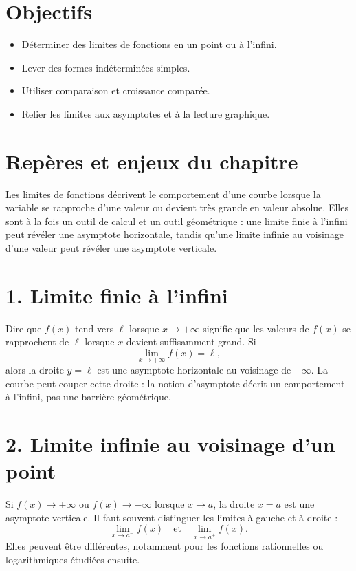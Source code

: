 
\section{Objectifs}
\begin{itemize}
\item Déterminer des limites de fonctions en un point ou à l’infini.
\item Lever des formes indéterminées simples.
\item Utiliser comparaison et croissance comparée.
\item Relier les limites aux asymptotes et à la lecture graphique.
\end{itemize}

\section{Repères et enjeux du chapitre}
Les limites de fonctions décrivent le comportement d'une courbe lorsque la variable se rapproche d'une valeur ou devient très grande en valeur absolue. Elles sont à la fois un outil de calcul et un outil géométrique : une limite finie à l'infini peut révéler une asymptote horizontale, tandis qu'une limite infinie au voisinage d'une valeur peut révéler une asymptote verticale.

\section{1. Limite finie à l’infini}
Dire que $f(x)$ tend vers $\ell$ lorsque $x\to+\infty$ signifie que les valeurs de $f(x)$ se rapprochent de $\ell$ lorsque $x$ devient suffisamment grand. Si
\[
\lim_{x\to+\infty}f(x)=\ell,
\]
alors la droite $y=\ell$ est une asymptote horizontale au voisinage de $+\infty$. La courbe peut couper cette droite : la notion d'asymptote décrit un comportement à l'infini, pas une barrière géométrique.

\section{2. Limite infinie au voisinage d’un point}
Si $f(x)\to+\infty$ ou $f(x)\to-\infty$ lorsque $x\to a$, la droite $x=a$ est une asymptote verticale. Il faut souvent distinguer les limites à gauche et à droite :
\[
\lim_{x\to a^-}f(x)\quad\text{et}\quad\lim_{x\to a^+}f(x).
\]
Elles peuvent être différentes, notamment pour les fonctions rationnelles ou logarithmiques étudiées ensuite.

